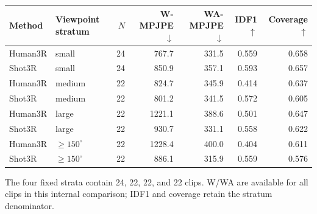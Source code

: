 \begin{tabular}{llrrrrr}
\toprule
Method & Viewpoint stratum & $N$ & W-MPJPE $\downarrow$ & WA-MPJPE $\downarrow$ & IDF1 $\uparrow$ & Coverage $\uparrow$ \\
\midrule
Human3R & small & 24 & 767.7 & 331.5 & 0.559 & 0.658 \\
Shot3R & small & 24 & 850.9 & 357.1 & 0.593 & 0.657 \\
\addlinespace
Human3R & medium & 22 & 824.7 & 345.9 & 0.414 & 0.637 \\
Shot3R & medium & 22 & 801.2 & 341.5 & 0.572 & 0.605 \\
\addlinespace
Human3R & large & 22 & 1221.1 & 388.6 & 0.501 & 0.647 \\
Shot3R & large & 22 & 930.7 & 331.1 & 0.558 & 0.622 \\
\addlinespace
Human3R & $\geq150^\circ$ & 22 & 1228.4 & 400.0 & 0.404 & 0.611 \\
Shot3R & $\geq150^\circ$ & 22 & 886.1 & 315.9 & 0.559 & 0.576 \\
\bottomrule
\end{tabular}
\parbox{0.99\textwidth}{\footnotesize The four fixed strata contain 24, 22, 22, and 22 clips. W/WA are available for all clips in this internal comparison; IDF1 and coverage retain the stratum denominator.}
